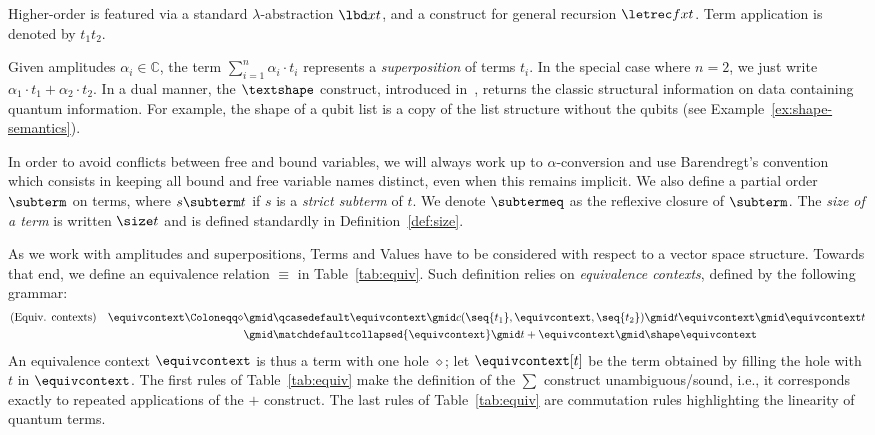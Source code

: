 Higher-order is featured via a standard $\lambda$-abstraction $\lbd x t$, and a
construct for general recursion $\letrec f x t$. Term application is denoted by
$t_1t_2$.

Given amplitudes $\alpha_i \in \mathbb C$, the term $\sum_{i=1}^n \alpha_i
\cdot t_i$ represents a \emph{superposition} of terms $t_i$. In the special
case where $n=2$, we just write $\alpha_1 \cdot t_1+\alpha_2 \cdot t_2$. In a
dual manner, the $\textshape$ construct, introduced in~\cite{GLRSV13},
returns the classic structural information on data containing quantum
information. For example, the shape of a qubit list is a copy of the list
structure without the qubits (see Example~\ref{ex:shape-semantics}).


In order to avoid conflicts
between free and bound variables, we will always work up to $\alpha$-conversion
and use Barendregt's convention~\cite[p. 26]{Bar84} which consists in keeping
all bound and free variable names distinct, even when this remains implicit.
We also define a partial order $\subterm$ on terms, where $s \subterm t$ if $s$
is a \emph{strict subterm} of $t$. We denote $\subtermeq$ as the reflexive
closure of $\subterm$. The \emph{size of a term} is written $\size t$ and is
defined standardly in Definition~\ref{def:size}.

As we work with amplitudes and superpositions, Terms and Values have to be
considered with respect to a vector space
structure. Towards that end, we define an equivalence relation $\equiv$ in
Table~\ref{tab:equiv}. Such definition relies on \emph{equivalence contexts},
defined by the following grammar:
\[
  \begin{aligned}
    (\text{Equiv. contexts}) \quad   \equivcontext \Coloneqq \diamond & \gmid
    \qcasedefault \equivcontext \gmid c(\seq{t_1}, \equivcontext, \seq{t_2})
    \gmid t \equivcontext \gmid \equivcontext t\\
    &\gmid \matchdefaultcollapsed{\equivcontext}  \gmid t + \equivcontext \gmid
    \shape \equivcontext
  \end{aligned}
\]
An equivalence context $\equivcontext$ is thus a term with one hole $\diamond$;
let $\equivcontext[t]$ be the term obtained by filling the hole with
$t$ in $\equivcontext$.
The first rules of Table~\ref{tab:equiv} make the definition of the $\sum$
construct unambiguous/sound, i.e., it corresponds exactly to repeated
applications of the $+$ construct. The last rules of Table~\ref{tab:equiv} are
commutation rules highlighting the linearity of quantum terms.

